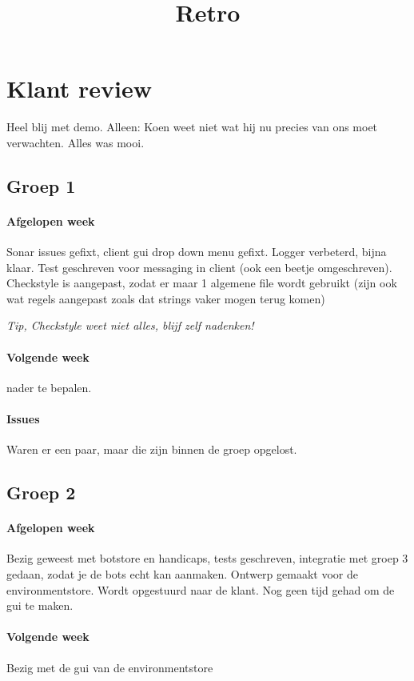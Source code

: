 \documentclass{article}
\begin{document}
\title{Retro}
\maketitle

\section*{Klant review}
Heel blij met demo. Alleen: 
Koen weet niet wat hij nu precies van ons moet verwachten. 
Alles was mooi. 

\subsection*{Groep 1}
\paragraph*{Afgelopen week}
Sonar issues gefixt, client gui drop down menu gefixt. Logger verbeterd, bijna klaar. Test geschreven voor messaging in client (ook een beetje omgeschreven). Checkstyle is aangepast, zodat er maar 1 algemene file wordt gebruikt (zijn ook wat regels aangepast zoals dat strings vaker mogen terug komen)
\begin{center}
\emph{Tip, Checkstyle weet niet alles, blijf zelf nadenken!}
\end{center}
\paragraph*{Volgende week}
nader te bepalen. 

\paragraph*{Issues} Waren er een paar, maar die zijn binnen de groep opgelost. 

\subsection*{Groep 2}
\paragraph*{Afgelopen week}
Bezig geweest met botstore en handicaps, tests geschreven, integratie met groep 3 gedaan, zodat je de bots echt kan aanmaken. Ontwerp gemaakt voor de environmentstore. Wordt opgestuurd naar de klant. Nog geen tijd gehad om de gui te maken. 

\paragraph*{Volgende week} 
Bezig met de gui van de environmentstore
\end{document}
